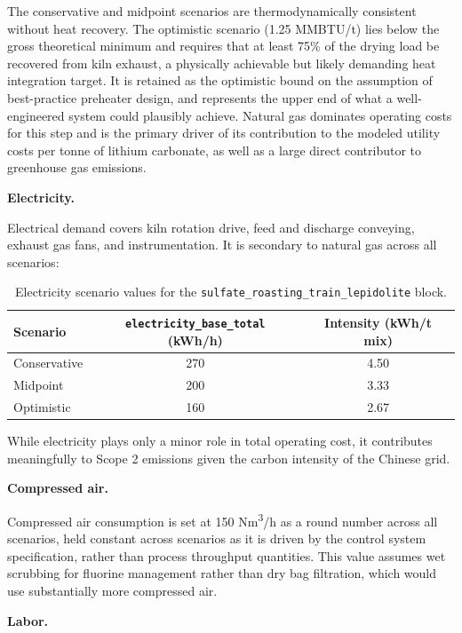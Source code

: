 \noindent The conservative and midpoint scenarios are thermodynamically consistent without heat recovery. The optimistic scenario (1.25 MMBTU/t) lies below the gross theoretical minimum and requires that at least 75\% of the drying load be recovered from kiln exhaust, a physically achievable but likely demanding heat integration target. It is retained as the optimistic bound on the assumption of best-practice preheater design, and represents the upper end of what a well-engineered system could plausibly achieve. Natural gas dominates operating costs for this step and is the primary driver of its contribution to the modeled utility costs per tonne of lithium carbonate, as well as a large direct contributor to greenhouse gas emissions.

\medskip
\noindent\textbf{Electricity.}\quad

Electrical demand covers kiln rotation drive, feed and discharge conveying, exhaust gas fans, and instrumentation. It is secondary to natural gas across all scenarios:

\begin{table}[h!]
\caption{Electricity scenario values for the \texttt{sulfate\_roasting\_train\_lepidolite} block.}
\centering
\begin{tabular}{lcc}
\toprule
\textbf{Scenario} & \texttt{electricity\_base\_total} (kWh/h) & \textbf{Intensity (kWh/t mix)} \\
\midrule
Conservative & 270 & 4.50 \\
Midpoint     & 200 & 3.33 \\
Optimistic   & 160 & 2.67 \\
\bottomrule
\end{tabular}
\end{table}

\noindent While electricity plays only a minor role in total operating cost, it contributes meaningfully to Scope 2 emissions given the carbon intensity of the Chinese grid.

\medskip
\noindent\textbf{Compressed air.}\quad

Compressed air consumption is set at 150 \si{Nm^3/h} as a round number across all scenarios, held constant across scenarios as it is driven by the control system specification, rather than process throughput quantities. This value assumes wet scrubbing for fluorine management rather than dry bag filtration, which would use substantially more compressed air.

\medskip
\noindent\textbf{Labor.}\quad


